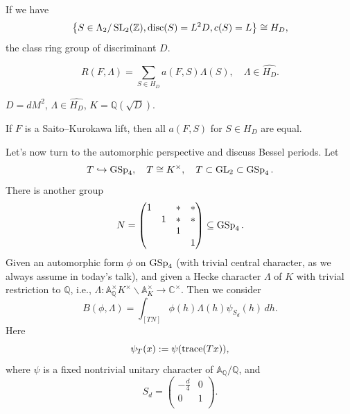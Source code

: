 \documentclass[reqno]{amsart} 
\begin{document}
If we have
\begin{equation*}
  \left\{ S \in \Lambda_2 / \operatorname{SL}_2(\mathbb{Z}), \operatorname{disc}(S) = L^2 D, c(S) = L \right\} \cong H_D,
\end{equation*}
the class ring group of discriminant $D$.

\begin{equation*}
  R(F, \Lambda ) = \sum_{S \in H_D } a(F, S) \Lambda(S), \quad
  \Lambda \in \widehat{H_D}.
\end{equation*}
\begin{remark}\label{remark:cnfg5j8o2u}
  $D = d M^2$, $\Lambda \in \widehat{H_D}$, $K = \mathbb{Q}(\sqrt{D})$.
\end{remark}
\begin{remark}\label{remark:cnfg5j8p19}
  If $F$ is a Saito--Kurokawa lift, then all $a(F, S)$ for $S \in H_D$ are equal.
\end{remark}

Let's now turn to the automorphic perspective and discuss Bessel periods.  Let
\begin{equation*}
T \hookrightarrow \operatorname{GSp}_4 , \quad T \cong K^\times, \quad T \subset \operatorname{GL}_2 \subset \operatorname{GSp}_4.
\end{equation*}
There is another group
\begin{equation*}
  N =
  \begin{pmatrix}
1 &  & \ast & \ast \\
 & 1 & \ast & \ast \\
  &  & 1 & \\
& & & 1 \\
\end{pmatrix} \subseteq \operatorname{GSp}_4.
\end{equation*}
Given an automorphic form $\phi$ on $\operatorname{GSp}_4$ (with trivial central character, as we always assume in today's talk), and given a Hecke character $\Lambda$ of $K$ with trivial restriction to $\mathbb{Q}$, i.e., $\Lambda : \mathbb{A}_{\mathbb{Q} }^\times K^\times \backslash \mathbb{A}_K^\times \rightarrow \mathbb{C}^\times$.  Then we consider
\begin{equation*}
  B(\phi, \Lambda ) = \int_{[T N]}
\phi(h) \Lambda(h) \psi_{S_d }(h) \, d h.  
\end{equation*}
Here
\begin{equation*}
\psi_T(x) := \psi(\operatorname{trace}(T x)),
\end{equation*}
where $\psi$ is a fixed nontrivial unitary character of $\mathbb{A}_{\mathbb{Q}} / \mathbb{Q}$, and
\begin{equation*}
S_d =
\begin{pmatrix}
- \frac{d}{4} & 0 \\
0 & 1 \\
\end{pmatrix}.
\end{equation*}
\end{document}
